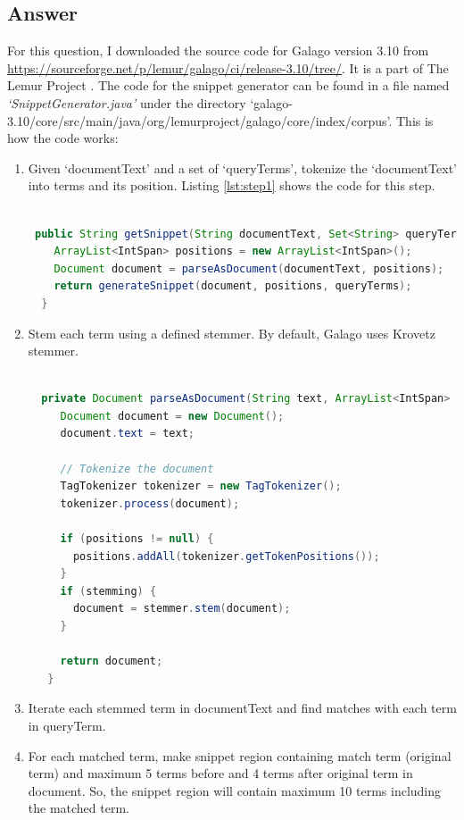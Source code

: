\documentclass[letterpaper,11pt]{article}
\begin{document}
\subsection*{Answer}
For this question, I downloaded the source code for Galago version 3.10 \cite{galago_3.10} from \url{https://sourceforge.net/p/lemur/galago/ci/release-3.10/tree/}. It is a part of The Lemur Project \cite{lemur}. The code for the snippet generator can be found in a file named \textit{`SnippetGenerator.java'} under the directory `galago-3.10/core/src/main/java/org/lemurproject/galago/core/index/corpus'. This is how the code works:
\begin{enumerate}
\item Given `documentText' and a set of `queryTerms', tokenize the `documentText' into terms and its position. Listing \ref{lst:step1} shows the code for this step. 

\begin{lstlisting}[language=Java, caption={}, label={lst:step1}]

 public String getSnippet(String documentText, Set<String> queryTerms) throws IOException {
    ArrayList<IntSpan> positions = new ArrayList<IntSpan>();
    Document document = parseAsDocument(documentText, positions);
    return generateSnippet(document, positions, queryTerms);
  }

\end{lstlisting}

\item Stem each term using a defined stemmer. By default, Galago uses Krovetz stemmer. 

\begin{lstlisting}[language=Java, caption={}, label={lst:step2}]

  private Document parseAsDocument(String text, ArrayList<IntSpan> positions) throws IOException {
     Document document = new Document();
     document.text = text;
 
     // Tokenize the document
     TagTokenizer tokenizer = new TagTokenizer();
     tokenizer.process(document);
 
     if (positions != null) {
       positions.addAll(tokenizer.getTokenPositions());
     }
     if (stemming) {
       document = stemmer.stem(document);
     }
 
     return document;
   }

\end{lstlisting}

\item Iterate each stemmed term in documentText and find matches with each term in queryTerm. 
\item For each matched term, make snippet region containing match term (original term) and maximum 5 terms before and 4 terms after original term in document. So, the snippet region will contain maximum 10 terms including the matched term. 


\end{enumerate}
\end{document}
